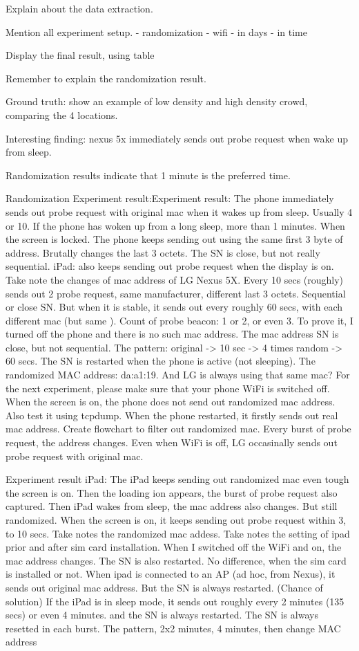 Explain about the data extraction.

Mention all experiment setup.
- randomization
- wifi
	- in days
	- in time

Display the final result, using table

Remember to explain the randomization result.

Ground truth: show an example of low density and high density crowd, comparing the 4 locations.

Interesting finding: nexus 5x immediately sends out probe request when wake up from sleep.

Randomization results indicate that 1 minute is the preferred time.

Randomization Experiment result:Experiment result:
The phone immediately sends out probe request with original mac when it wakes up from sleep. Usually 4 or 10. If the phone has woken up from a long sleep, more than 1 minutes. When the screen is locked.
The phone keeps sending out using the same first 3 byte of address. Brutally changes the last 3 octets.
The SN is close, but not really sequential.
iPad: also keeps sending out probe request when the display is on.
Take note the changes of mac address of LG Nexus 5X.
Every 10 secs (roughly) sends out 2 probe request, same manufacturer, different last 3 octets. Sequential or close SN.
But when it is stable, it sends out every roughly 60 secs, with each different mac (but same ). Count of probe beacon: 1 or 2, or even 3.
To prove it, I turned off the phone and there is no such mac address.
The mac address SN is close, but not sequential.
The pattern: original -> 10 sec -> 4 times random -> 60 secs.
The SN is restarted when the phone is active (not sleeping).
The randomized MAC address: da:a1:19. And LG is always using that same mac?
For the next experiment, please make sure that your phone WiFi is switched off.
When the screen is on, the phone does not send out randomized mac address.
Also test it using tcpdump.
When the phone restarted, it firstly sends out real mac address.
Create flowchart to filter out randomized mac.
Every burst of probe request, the address changes.
Even when WiFi is off, LG occasinally sends out probe request with original mac.

Experiment result iPad:
The iPad keeps sending out randomized mac even tough the screen is on.
Then the loading ion appears, the burst of probe request also captured.
Then iPad wakes from sleep, the mac address also changes. But still randomized.
When the screen is on, it keeps sending out probe request within 3, to 10 secs.
Take notes the randomized mac addess.
Take notes the setting of ipad prior and after sim card installation.
When I switched off the WiFi and on, the mac address changes. The SN is also restarted.
No difference, when the sim card is installed or not.
When ipad is connected to an AP (ad hoc, from Nexus), it sends out original mac address.
But the SN is always restarted. (Chance of solution)
If the iPad is in sleep mode, it sends out roughly every 2 minutes (135 secs) or even 4 minutes. and the SN is always restarted.
The SN is always resetted in each burst.
The pattern, 2x2 minutes, 4 minutes, then change MAC address

